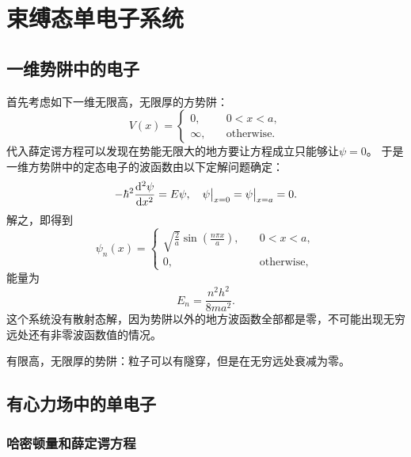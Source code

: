 \chapter{束缚态单电子系统}

\section{一维势阱中的电子}

首先考虑如下一维无限高，无限厚的方势阱：
\begin{equation}
    V(x) = \begin{cases}
        0, \quad &0 < x < a, \\
        \infty, \quad &\text{otherwise}.
    \end{cases}
\end{equation}
代入薛定谔方程可以发现在势能无限大的地方要让方程成立只能够让$\psi=0$。
于是一维方势阱中的定态电子的波函数由以下定解问题确定：
\[
    - \hbar^2 \dv[2]{\psi}{x} = E \psi, \quad \psi\big|_{x=0} = \psi\big|_{x=a} = 0.
\]
解之，即得到
\begin{equation}
    \psi_n(x) = \begin{cases}
        \sqrt{\frac{2}{a}} \sin(\frac{n \pi x}{a}), \quad &0 < x < a, \\
        0, \quad &\text{otherwise},
    \end{cases}
\end{equation}
能量为
\begin{equation}
    E_n = \frac{n^2 h^2}{8 m a^2}.
\end{equation}
这个系统没有散射态解，因为势阱以外的地方波函数全部都是零，不可能出现无穷远处还有非零波函数值的情况。

有限高，无限厚的势阱：粒子可以有隧穿，但是在无穷远处衰减为零。

\section{有心力场中的单电子}

\subsection{哈密顿量和薛定谔方程}

